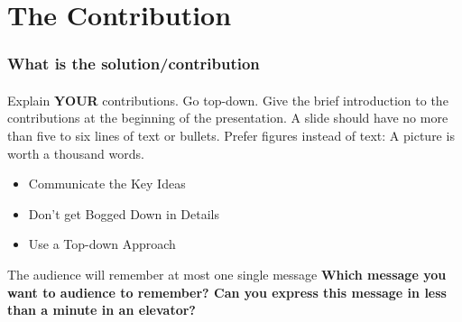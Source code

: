 \documentclass[11pt]{beamer}              %
\begin{document}
\section{The Contribution}
\begin{frame}
\frametitle{What is the solution/contribution}
\framesubtitle{}
Explain \textbf{YOUR} contributions. Go top-down. Give the brief introduction to the contributions at the beginning of the presentation. A slide should have no more than five to six lines of text or bullets. Prefer figures instead of text: A picture is worth a thousand words.
\begin{itemize}
\item Communicate the Key Ideas
\item Don’t get Bogged Down in Details
\item Use a Top-down Approach
\end{itemize}

The audience will remember at most one single message \textbf{Which message you want to audience to remember? Can you express this message in less than a minute in an elevator?}

\end{frame}
\end{document}
